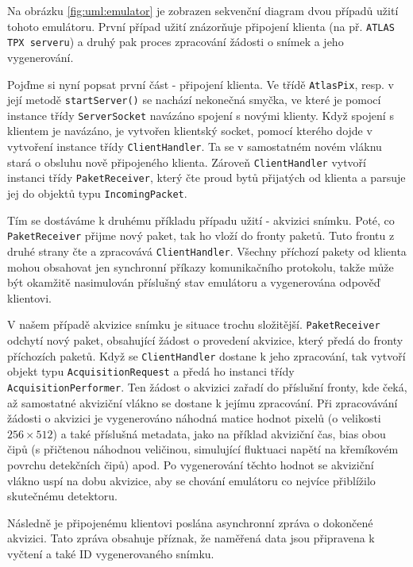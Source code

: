 Na obrázku \ref{fig:uml:emulator} je zobrazen sekvenční diagram dvou případů užití tohoto emulátoru. První případ užití znázorňuje připojení klienta (na př. \texttt{ATLAS TPX serveru}) a druhý pak proces zpracování žádosti o snímek a jeho vygenerování.

Pojďme si nyní popsat první část - připojení klienta. Ve třídě \texttt{AtlasPix}, resp. v její metodě \texttt{startServer()} se nachází nekonečná smyčka, ve které je pomocí instance třídy \texttt{ServerSocket} navázáno spojení s novými klienty. Když spojení s klientem je navázáno, je vytvořen klientský socket, pomocí kterého dojde v vytvoření instance třídy \texttt{ClientHandler}. Ta se v samostatném novém vláknu stará o obsluhu nově připojeného klienta. Zároveň \texttt{ClientHandler} vytvoří instanci třídy \texttt{PaketReceiver}, který čte proud bytů přijatých od klienta a parsuje jej do objektů typu \texttt{IncomingPacket}.

Tím se dostáváme k druhému příkladu případu užití - akvizici snímku. Poté, co \texttt{PaketReceiver} přijme nový paket, tak ho vloží do fronty paketů. Tuto frontu z druhé strany čte a zpracovává \texttt{ClientHandler}. Všechny příchozí pakety od klienta mohou obsahovat jen synchronní příkazy komunikačního protokolu, takže může být okamžitě nasimulován příslušný stav emulátoru a vygenerována odpověď klientovi. 

V našem případě akvizice snímku je situace trochu složitější. \texttt{PaketReceiver} odchytí nový paket, obsahující žádost o provedení akvizice, který předá do fronty příchozích paketů. Když se \texttt{ClientHandler} dostane k jeho zpracování, tak vytvoří objekt typu \texttt{AcquisitionRequest} a předá ho instanci třídy \texttt{AcquisitionPerformer}. Ten žádost o akvizici zařadí do příslušní fronty, kde čeká, až samostatné akviziční vlákno se dostane k jejímu zpracování. Při zpracovávání žádosti o akvizici je vygenerováno náhodná matice hodnot pixelů (o velikosti $256\times512$) a také příslušná metadata, jako na příklad akviziční čas, bias obou čipů (s přičtenou náhodnou veličinou, simulující fluktuaci napětí na křemíkovém povrchu detekčních čipů) apod. Po vygenerování těchto hodnot se akviziční vlákno uspí na dobu akvizice, aby se chování emulátoru co nejvíce přiblížilo skutečnému detektoru.

Následně je připojenému klientovi poslána asynchronní zpráva o dokončené akvizici. Tato zpráva obsahuje příznak, že naměřená data jsou připravena k vyčtení a také ID vygenerovaného snímku. 

